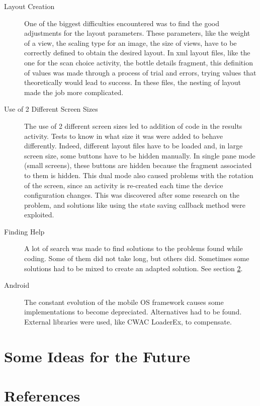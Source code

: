 \begin{description}

	\item[Layout Creation] One of the biggest difficulties encountered was to find the good adjustments for the layout parameters. These parameters, like the weight of a view, the scaling type for an image, the size of views, have to be correctly defined to obtain the desired layout. In xml layout files, like the one for the scan choice activity, the bottle details fragment, this definition of values was made through a process of trial and errors, trying values that theoretically would lead to success. In these files, the nesting of layout made the job more complicated.
	
	\item[Use of 2 Different Screen Sizes] The use of 2 different screen sizes led to addition of code in the results activity. Tests to know in what size it was were added to behave differently. Indeed, different layout files have to be loaded and, in large screen size, some buttons have to be hidden manually. In single pane mode (small screens), these buttons are hidden because the fragment associated to them is hidden. This dual mode also caused problems with the rotation of the screen, since an activity is re-created each time the device configuration changes. This was discovered after some research on the problem, and solutions like using the state saving callback method were exploited.
	
	\item[Finding Help] A lot of search was made to find solutions to the problems found while coding. Some of them did not take long, but others did. Sometimes some solutions had to be mixed to create an adapted solution. See section \ref{references}.
	
	\item[Android] The constant evolution of the mobile OS framework causes some implementations to become depreciated. Alternatives had to be found. External libraries were used, like CWAC LoaderEx, to compensate.
\end{description}


\section{Some Ideas for the Future}



\section{References}
\label{references}

